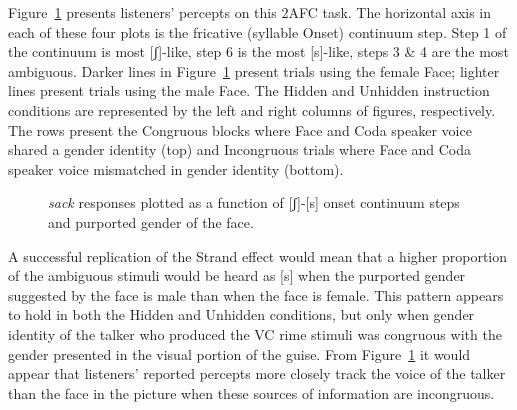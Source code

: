 \documentclass[
  letterpaper,
  DIV=11,
  numbers=noendperiod]{scrartcl}
\begin{document}
Figure~\ref{fig-scurve} presents listeners' percepts on this 2AFC task.
The horizontal axis in each of these four plots is the fricative
(syllable Onset) continuum step. Step 1 of the continuum is most
{[}ʃ{]}-like, step 6 is the most {[}s{]}-like, steps 3 \& 4 are the most
ambiguous. Darker lines in Figure~\ref{fig-scurve} present trials using
the female Face; lighter lines present trials using the male Face. The
Hidden and Unhidden instruction conditions are represented by the left
and right columns of figures, respectively. The rows present the
Congruous blocks where Face and Coda speaker voice shared a gender
identity (top) and Incongruous trials where Face and Coda speaker voice
mismatched in gender identity (bottom).

\begin{figure}


\caption{\label{fig-scurve}\emph{sack} responses plotted as a function
of {[}ʃ{]}-{[}s{]} onset continuum steps and purported gender of the
face.}

\end{figure}%

A successful replication of the Strand effect would mean that a higher
proportion of the ambiguous stimuli would be heard as {[}s{]} when the
purported gender suggested by the face is male than when the face is
female. This pattern appears to hold in both the Hidden and Unhidden
conditions, but only when gender identity of the talker who produced the
VC rime stimuli was congruous with the gender presented in the visual
portion of the guise. From Figure~\ref{fig-scurve} it would appear that
listeners' reported percepts more closely track the voice of the talker
than the face in the picture when these sources of information are
incongruous.
\end{document}
